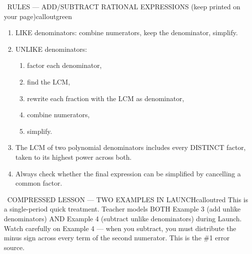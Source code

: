 \documentclass[11pt]{article}
\begin{document}


\begin{callout}{\IconBook\ RULES --- ADD/SUBTRACT RATIONAL EXPRESSIONS (keep printed on your page)}{calloutgreen}
\begin{enumerate}[leftmargin=2.1em,itemsep=1pt,topsep=3pt]
  \item LIKE denominators: combine numerators, keep the denominator, simplify.
  \item UNLIKE denominators:
  \begin{enumerate}[label=(\alph*),leftmargin=1.8em,itemsep=1pt,topsep=2pt]
    \item factor each denominator,
    \item find the LCM,
    \item rewrite each fraction with the LCM as denominator,
    \item combine numerators,
    \item simplify.
  \end{enumerate}
  \item The LCM of two polynomial denominators includes every DISTINCT factor, taken to its highest power across both.
  \item Always check whether the final expression can be simplified by cancelling a common factor.
\end{enumerate}
\end{callout}

\begin{callout}{\IconWarn\ COMPRESSED LESSON --- TWO EXAMPLES IN LAUNCH}{calloutred}
This is a single-period quick treatment. Teacher models BOTH Example 3 (add unlike denominators) AND Example 4 (subtract unlike denominators) during Launch.\\
Watch carefully on Example 4 --- when you subtract, you must distribute the minus sign across every term of the second numerator. This is the \#1 error source.
\end{callout}
\end{document}
